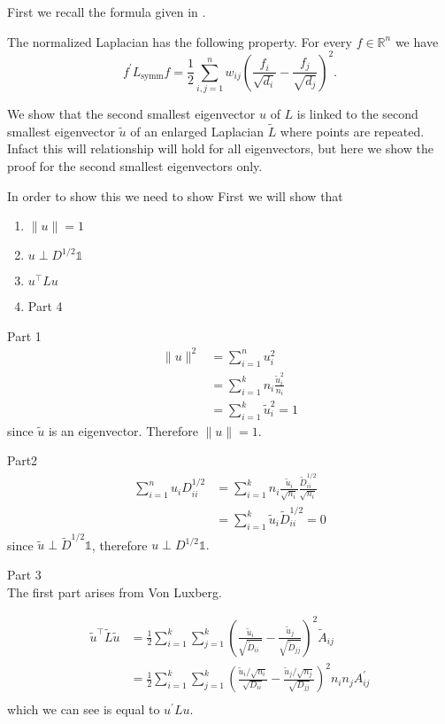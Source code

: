 \documentclass[12pt, a4]{report}
\begin{document}
First we recall the formula given in \cite{Luxburg2008}.

The normalized Laplacian has the following property.
For every $f \in  \mathbb{R}^n$ we have
\begin{equation}
  \label{eq:luxburg_vectors}
  f^{\prime} L_{\text{symm}}f = \frac{1}{2} \sum_{i,j=1}^n w_{ij} \left( \frac{f_i}{\sqrt{d_i}} - \frac{f_j}{\sqrt{d_j}}  \right)^2.
\end{equation}

We show that the second smallest eigenvector $u$ of $L$ is linked to the second smallest eigenvector $\tilde{u}$ of an enlarged Laplacian $\tilde{L}$ where points are repeated.
Infact this will relationship will hold for all eigenvectors, but here we show the proof for the second smallest eigenvectors only. 

In order to show this we need to show
First we will show that 
\begin{enumerate}
\item $\|u\| = 1$
\item $u \perp D^{1/2} \mathds{1}$ 
\item $u^{\top} L u$
\item Part 4
\end{enumerate}

Part 1\\
\begin{align*}
 \|u\|^2 &= \sum_{i=1}^{n}u_i^2 \\
&= \sum_{i = 1}^{k}n_i \frac{\tilde{u}_i^2}{n_i} \\
&= \sum_{i=1}^{k}\tilde{u}_i^2 = 1 
\end{align*}
since $\tilde{u}$ is an eigenvector. Therefore $\|u\| = 1$. 

Part2 \\
\begin{align*}
 \sum_{i=1}^nu_i D_{ii}^{1/2} &= \sum_{i=1}^k n_i \frac{\tilde{u}_i}{\sqrt{n_i}} \frac{\tilde{D}^{1/2}_{ii}}{\sqrt{n_i}} \\
&= \sum_{i=1}^k \tilde{u}_i \tilde{D}^{1/2}_{ii} = 0
\end{align*}
since $\tilde{u} \perp \tilde{D}^{1/2} \mathds{1}$, therefore $u \perp D^{1/2} \mathds{1}.$ 

Part 3 \\
The first part arises from Von Luxberg. 

\begin{align*}
  \tilde{u}^\top \tilde{L} \tilde{u} &= \frac{1}{2} \sum_{i = 1}^k \sum_{j = 1}^k \left( \frac{\tilde{u}_i}{\sqrt{\tilde{D}_{ii \phantom{j}}}} - \frac{\tilde{u}_j}{\sqrt{\tilde{D}_{jj}}}  \right)^2 \tilde{A}_{ij} \\
 &= \frac{1}{2} \sum_{i = 1}^k \sum_{j = 1}^k \left( \frac{\tilde{u}_i / \sqrt{n_i}}{\sqrt{D_{ii}}} - \frac{\tilde{u}_j / \sqrt{n_j}}{\sqrt{D_{jj}}} \right)^2 n_i n_j  A^{\prime}_{ij} \\
\end{align*}
which we can see is equal to $u^{\prime}Lu$.
\end{document}
